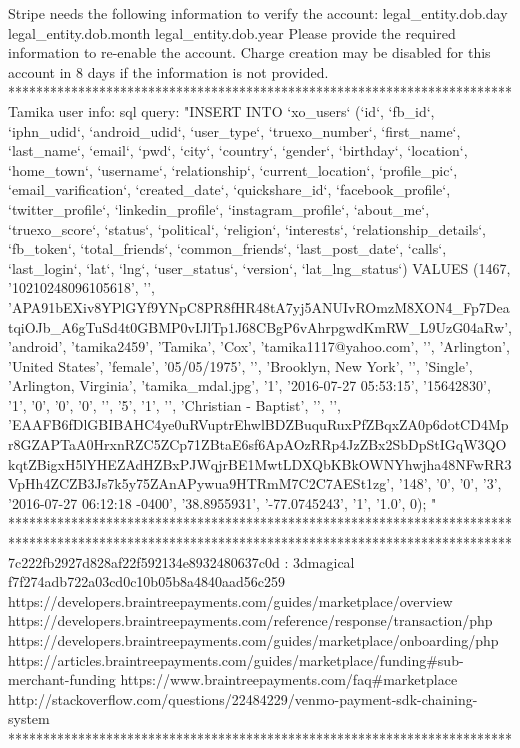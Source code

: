 {{{{Stripe needs the following information to verify the account:
legal_entity.dob.day
legal_entity.dob.month
legal_entity.dob.year
Please provide the required information to re-enable the account. Charge creation may be disabled for this account in 8 days if the information is not provided.
************************************************************************
Tamika user info:
sql query:
"INSERT INTO `xo_users` (`id`, `fb_id`, `iphn_udid`, `android_udid`, `user_type`, `truexo_number`, `first_name`, `last_name`, `email`, `pwd`, `city`, `country`, `gender`, `birthday`, `location`, `home_town`, `username`, `relationship`, `current_location`, `profile_pic`, `email_varification`, `created_date`, `quickshare_id`, `facebook_profile`, `twitter_profile`, `linkedin_profile`, `instagram_profile`, `about_me`, `truexo_score`, `status`, `political`, `religion`, `interests`, `relationship_details`, `fb_token`, `total_friends`, `common_friends`, `last_post_date`, `calls`, `last_login`, `lat`, `lng`, `user_status`, `version`, `lat_lng_status`) VALUES
(1467,  '10210248096105618',    '', 'APA91bEXiv8YPlGYf9YNpC8PR8fHR48tA7yj5ANUIvROmzM8XON4_Fp7DeatqiOJb_A6gTuSd4t0GBMP0vIJlTp1J68CBgP6vAhrpgwdKmRW_L9UzG04aRw',  'android',  'tamika2459',   'Tamika',   'Cox',  'tamika1117@yahoo.com', '', 'Arlington',    'United States',    'female',   '05/05/1975',   '', 'Brooklyn, New York',   '', 'Single',   'Arlington, Virginia',  'tamika_mdal.jpg',  '1',    '2016-07-27 05:53:15',  '15642830', '1',    '0',    '0',    '0',    '', '5',    '1',    '', 'Christian - Baptist',  '', '', 'EAAFB6fDlGBIBAHC4ye0uRVuptrEhwlBDZBuquRuxPfZBqxZA0p6dotCD4Mpr8GZAPTaA0HrxnRZC5ZCp71ZBtaE6sf6ApAOzRRp4JzZBx2SbDpStIGqW3QOkqtZBigxH5lYHEZAdHZBxPJWqjrBE1MwtLDXQbKBkOWNYhwjha48NFwRR3VpHh4ZCZB3Js7k5y75ZAnAPywua9HTRmM7C2C7AESt1zg',  '148',  '0',    '0',    '3',    '2016-07-27 06:12:18 -0400',    '38.8955931',   '-77.0745243',  '1',    '1.0',  0);
"
************************************************************************
************************************************************************
7c222fb2927d828af22f592134e8932480637c0d : 3dmagical
f7f274adb722a03cd0c10b05b8a4840aad56c259
https://developers.braintreepayments.com/guides/marketplace/overview
https://developers.braintreepayments.com/reference/response/transaction/php
https://developers.braintreepayments.com/guides/marketplace/onboarding/php
https://articles.braintreepayments.com/guides/marketplace/funding#sub-merchant-funding
https://www.braintreepayments.com/faq#marketplace
http://stackoverflow.com/questions/22484229/venmo-payment-sdk-chaining-system   
************************************************************************
}}}}
